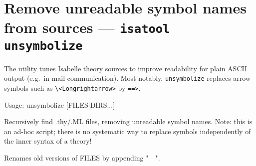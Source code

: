\section{Remove unreadable symbol names from sources --- \texttt{isatool unsymbolize}}

The  utility tunes Isabelle theory sources to improve
readability for plain ASCII output (e.g.\ in mail communication).  Most
notably, \texttt{unsymbolize} replaces arrow symbols such as
\verb|\<Longrightarrow>| by \verb|==>|.
\begin{ttbox}
Usage: unsymbolize [FILES|DIRS...]

  Recursively find .thy/.ML files, removing unreadable symbol names.
  Note: this is an ad-hoc script; there is no systematic way to replace
  symbols independently of the inner syntax of a theory!

  Renames old versions of FILES by appending "~~".
\end{ttbox}

